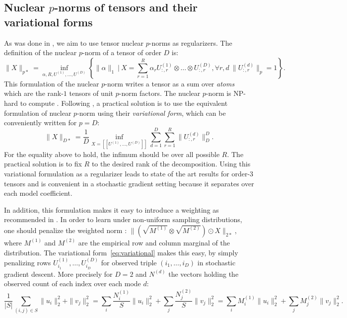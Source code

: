 \documentclass{article}
\newcommand{\brck}[1]{[\![#1]\!]}
\begin{document}
\subsection{Nuclear $p$-norms of tensors and their variational forms}
\label{sec:variational}
As was done in \citet{lacroix2018canonical}, we aim to use tensor nuclear $p$-norms as regularizers. The definition of the nuclear $p$-norm of a tensor \citep{friedland_nuclear_2014} of order $D$ is:
\begin{equation}
    \|X\|_{p*} = \inf_{\alpha, R, U^{(1)}, \dots, U^{(D)}}\left\{
    \|\alpha\|_1~|~X=\sum_{r=1}^R \alpha_r U^{(1)}_{:, r} \otimes \dots \otimes U^{(D)}_{:, r}, \forall r,d~\|U^{(d)}_{:,r}\|_p=1
    \right\}.
\end{equation}
This formulation of the nuclear $p$-norm writes a tensor as a sum over \emph{atoms} which are the rank-$1$ tensors of unit $p$-norm factors.  The nuclear $p$-norm is NP-hard to compute \citep{friedland_nuclear_2014}. Following \citet{lacroix2018canonical}, a practical solution is to use the equivalent formulation of nuclear $p$-norm using their \emph{variational form}, which can be conveniently written for $p=D$:
\begin{equation}
    \|X\|_{D*} = \frac{1}{D}\inf_{X=\brck{U^{(1)}, \dots, U^{(D)}}}\sum_{d=1}^D\sum_{r=1}^R\|U^{(d)}_{:, r}\|_D^D.
    \label{eq:variational}
\end{equation}
For the equality above to hold, the infimum should be over all possible $R$. The practical solution is to fix $R$ to the desired rank of the decomposition. Using this variational formulation as a regularizer leads to state of the art results for order-3 tensors \citep{lacroix2018canonical} and is convenient in a stochastic gradient setting because it separates over each model coefficient.

In addition, this formulation makes it easy to introduce a weighting as recommended in \citet{srebro_collaborative_2010, foygel_learning_2011}. In order to learn under non-uniform sampling distributions, one should penalize the weighted norm : $\|\left(\sqrt{M^{(1)}}\otimes\sqrt{M^{(2)}}\right)\odot X\|_{2*}$, where $M^{(1)}$ and $M^{(2)}$ are the empirical row and column marginal of the distribution. The variational form~\eqref{eq:variational} makes this easy, by simply penalizing rows $U^{(1)}_{i_1}, \dots, U^{(D)}_{i_D}$ for observed triple $(i_1,\dots,i_D)$ in stochastic gradient descent. More precisely for $D=2$ and $N^{(d)}$ the vectors holding the observed count of each index over each mode $d$:
\begin{equation}
    \frac{1}{|S|}\sum_{(i,j)\in S}\|u_i\|_2^2+\|v_j\|_2^2 = \sum_{i} \frac{N^{(1)}_i}{S}\|u_i\|_2^2 + \sum_{j} \frac{N^{(2)}_j}{S}\|v_j\|_2^2 = \sum_{i} M^{(1)}_i\|u_i\|_2^2 + \sum_{j} M^{(2)}_j\|v_j\|_2^2.
\end{equation}
\end{document}
